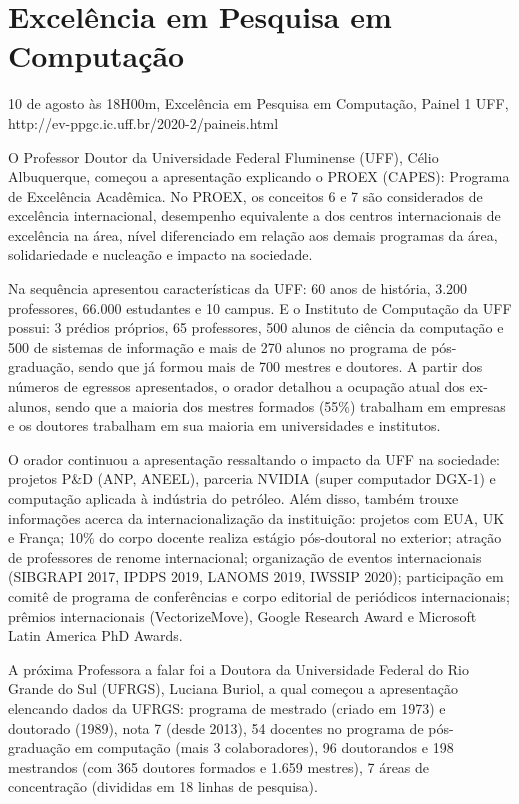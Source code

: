 \section{Excelência em Pesquisa em Computação}

\begin{center}
  \vspace{1cm}
  10 de agosto às 18H00m, Excelência em Pesquisa em Computação, Painel 1 UFF, http://ev-ppgc.ic.uff.br/2020-2/paineis.html
  \vspace{1cm}
\end{center}

O Professor Doutor da Universidade Federal Fluminense (UFF), Célio Albuquerque, começou a apresentação explicando o PROEX (CAPES): Programa de Excelência Acadêmica. No PROEX, os conceitos 6 e 7 são considerados de excelência internacional, desempenho equivalente a dos centros internacionais de excelência na área, nível diferenciado em relação aos demais programas da área, solidariedade e nucleação e impacto na sociedade.

Na sequência apresentou características da UFF: 60 anos de história, 3.200 professores, 66.000 estudantes e 10 campus. E o Instituto de Computação da UFF possui: 3 prédios próprios, 65 professores, 500 alunos de ciência da computação e 500 de sistemas de informação e mais de 270 alunos no programa de pós-graduação, sendo que já formou mais de 700 mestres e doutores. A partir dos números de egressos apresentados, o orador detalhou a ocupação atual dos ex-alunos, sendo que a maioria dos mestres formados (55\%) trabalham em empresas e os doutores trabalham em sua maioria em universidades e institutos.

O orador continuou a apresentação ressaltando o impacto da UFF na sociedade: projetos P\&D (ANP, ANEEL), parceria NVIDIA (super computador DGX-1) e computação aplicada à indústria do petróleo. Além disso, também trouxe informações acerca da internacionalização da instituição: projetos com EUA, UK e França; 10\% do corpo docente realiza estágio pós-doutoral no exterior; atração de professores de renome internacional; organização de eventos internacionais (SIBGRAPI 2017, IPDPS 2019, LANOMS 2019, IWSSIP 2020); participação em comitê de programa de conferências e corpo editorial de periódicos internacionais; prêmios internacionais (VectorizeMove), Google Research Award e Microsoft Latin America PhD Awards.

A próxima Professora a falar foi a Doutora da Universidade Federal do Rio Grande do Sul (UFRGS), Luciana Buriol, a qual começou a apresentação elencando dados da UFRGS: programa de mestrado (criado em 1973) e doutorado (1989), nota 7 (desde 2013), 54 docentes no programa de pós-graduação em computação (mais 3 colaboradores), 96 doutorandos e 198 mestrandos (com 365 doutores formados e 1.659 mestres), 7 áreas de concentração (divididas em 18 linhas de pesquisa).


